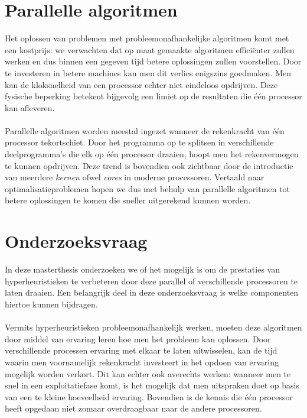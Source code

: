 \section{Parallelle algoritmen}

Het oplossen van problemen met probleemonafhankelijke algoritmen komt met een kostprijs: we verwachten dat op maat gemaakte algoritmen effici\"enter zullen werken en dus binnen een gegeven tijd betere oplossingen zullen voorstellen. Door te investeren in betere machines kan men dit verlies enigszins goedmaken. Men kan de kloksnelheid van een processor echter niet eindeloos opdrijven. Deze fysische beperking betekent bijgevolg een limiet op de resultaten die \'e\'en processor kan afleveren.

\paragraph{}
Parallelle algoritmen worden meestal ingezet wanneer de rekenkracht van \'e\'en processor tekortschiet. Door het programma op te splitsen in verschillende deelprogramma's die elk op \'e\'en processor draaien, hoopt men het rekenvermogen te kunnen opdrijven. Deze trend is bovendien ook zichtbaar door de introductie van meerdere \emph{kernen} ofwel \emph{cores} in moderne processoren. Vertaald naar optimalisatieproblemen hopen we dus met behulp van parallelle algoritmen tot betere oplossingen te komen die sneller uitgerekend kunnen worden.

\section{Onderzoeksvraag}

In deze masterthesis onderzoeken we of het mogelijk is om de prestaties van hyperheuristieken te verbeteren door deze parallel of verschillende processoren te laten draaien. Een belangrijk deel in deze onderzoeksvraag is welke componenten hiertoe kunnen bijdragen.

\paragraph{}
Vermits hyperheuristieken probleemonafhankelijk werken, moeten deze algoritmen door middel van ervaring leren hoe men het probleem kan oplossen. Door verschillende processen ervaring met elkaar te laten uitwisselen, kan de tijd waarin men voornamelijk rekenkracht investeert in het opdoen van ervaring mogelijk worden verkort. Dit kan echter ook averechts werken: wanneer men te snel in een exploitatiefase komt, is het mogelijk dat men uitspraken doet op basis van een te kleine hoeveelheid ervaring. Bovendien is de kennis die \'e\'en processor heeft opgedaan niet zomaar overdraagbaar naar de andere processoren.

